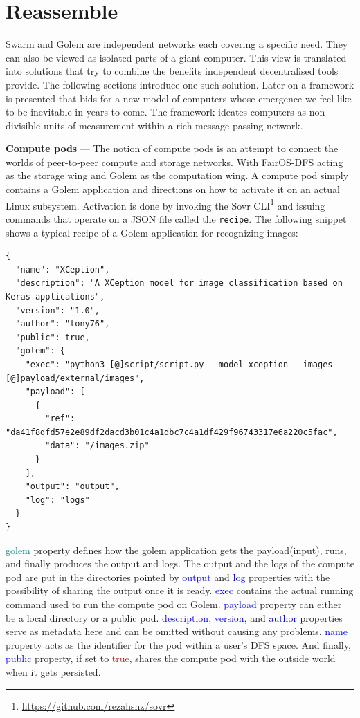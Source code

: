 \documentclass[a4paper, 10pt]{article}
\begin{document}
\section{Reassemble}
Swarm and Golem are independent networks each covering a specific need. They can also be viewed as isolated parts of a giant computer. This view is translated into solutions that try to combine the benefits independent decentralised tools provide. The following sections introduce one such solution. Later on a framework is presented that bids for a new model of computers whose emergence we feel like to be inevitable in years to come. The framework ideates computers as non-divisible units of measurement within a rich message passing network.
\par
\textbf{Compute pods} --- The notion of compute pods is an attempt to connect the worlds of peer-to-peer compute and storage networks. With FairOS-DFS acting as the storage wing and Golem as the computation wing. A compute pod simply contains a Golem application and directions on how to activate it on an actual Linux subsystem. Activation is done by invoking the Sovr CLI\footnote{\url{https://github.com/rezahsnz/sovr}} and issuing commands that operate on a JSON file called the \texttt{recipe}. The following snippet shows a typical recipe of a Golem application for recognizing images:
\begin{verbatim}
{
  "name": "XCeption",
  "description": "A XCeption model for image classification based on Keras applications",
  "version": "1.0",
  "author": "tony76",
  "public": true,
  "golem": {
    "exec": "python3 [@]script/script.py --model xception --images [@]payload/external/images",
    "payload": [
      {
        "ref": "da41f8dfd57e2e89df2dacd3b01c4a1dbc7c4a1df429f96743317e6a220c5fac",
        "data": "/images.zip"
      }
    ],
    "output": "output",
    "log": "logs"
  }
}
\end{verbatim}
\textcolor{teal}{golem} property defines how the golem application gets the payload(input), runs, and finally produces the output and logs. The output and the logs of the compute pod are put in the directories pointed by \textcolor{blue}{output} and \textcolor{blue}{log} properties with the possibility of sharing the output once it is ready. \textcolor{blue}{exec} contains the actual running command used to run the compute pod on Golem. \textcolor{blue}{payload} property can either be a local directory or a public pod. \textcolor{blue}{description}, \textcolor{blue}{version}, and \textcolor{blue}{author} properties serve as metadata here and can be omitted without causing any problems. \textcolor{blue}{name} property acts as the identifier for the pod within a user's DFS space. And finally, \textcolor{blue}{public} property, if set to \textcolor{brown}{true}, shares the compute pod with the outside world when it gets persisted.
\end{document}
